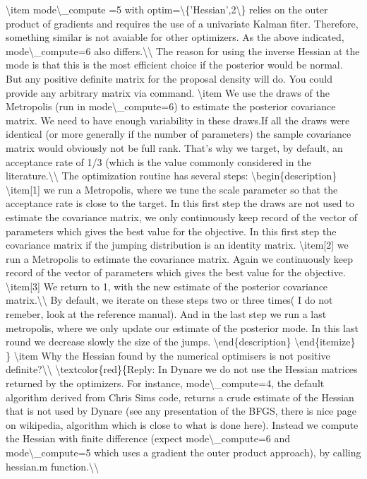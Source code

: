 \documentclass[10pt,math=newtx,citestyle=gb7714-2015,bibstyle=gb7714-2015]{elegantbook}
\begin{document}
	\textbackslash{}item mode\textbackslash{}\_compute =5 with optim=\textbackslash{}\{'Hessian',2\textbackslash{}\} relies on the outer product of gradients and requires the use of a univariate Kalman fiter. Therefore, something similar is not avaiable for other optimizers. As the above indicated, mode\textbackslash{}\_compute=6 also differs.\textbackslash{}\textbackslash{}
	The reason for using the inverse Hessian at the mode is that this is the most efficient choice if the posterior would be normal. But any positive definite matrix for the proposal density will do. You could provide any arbitrary matrix via command.
	\textbackslash{}item We use the draws of the Metropolis (run in mode\textbackslash{}\_compute=6) to estimate the posterior covariance matrix. We need to have enough variability in these draws.If all the draws were identical (or more generally if the number of parameters) the sample covariance matrix would obviously not be full rank. That's why we target, by default, an acceptance rate of 1/3 (which is the value commonly considered in the literature.\textbackslash{}\textbackslash{}
	The optimization routine has several steps:
	\textbackslash{}begin\{description\}
	\textbackslash{}item[1] we run a Metropolis, where we tune the scale parameter so that the acceptance rate is close to the target. In this first step the draws are not used to estimate the covariance matrix, we only continuously keep record of the vector of parameters which gives the best value for the objective. In this first step the covariance matrix if the jumping distribution is an identity matrix.
	\textbackslash{}item[2] we run a Metropolis to estimate the covariance matrix. Again we continuously keep record of the vector of parameters which gives the best value for the objective.
	\textbackslash{}item[3] We return to 1, with the new estimate of the posterior covariance matrix.\textbackslash{}\textbackslash{}
	By default, we iterate on these steps two or three times( I do not remeber, look at the reference manual). And in the last step we run a last metropolis, where we only update our estimate of the posterior mode. In this last round we decrease slowly the size of the jumps.
	\textbackslash{}end\{description\}
	\textbackslash{}end\{itemize\}
	\}
	\textbackslash{}item Why the Hessian found by the numerical optimisers is not positive definite?\textbackslash{}\textbackslash{}
	\textbackslash{}textcolor\{red\}\{Reply: In Dynare we do not use the Hessian matrices returned by the optimizers. For instance, mode\textbackslash{}\_compute=4, the default algorithm derived from Chris Sims code, returns a crude estimate of the Hessian that is not used by Dynare (see any presentation of the BFGS, there is nice page on wikipedia, algorithm which is close to what is done here). Instead we compute the Hessian with finite difference (expect mode\textbackslash{}\_compute=6 and mode\textbackslash{}\_compute=5 which uses a gradient the outer product approach), by calling hessian.m function.\textbackslash{}\textbackslash{}
\end{document}
